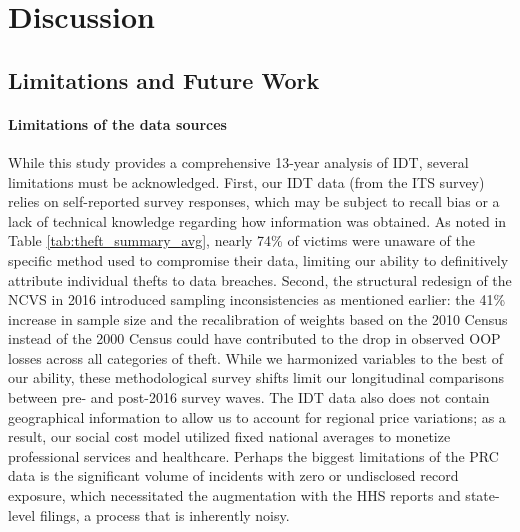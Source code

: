 \section{Discussion}
\label{sec:discussion}

\subsection{Limitations and Future Work}
\label{sec:limitations}

\paragraph{Limitations of the data sources}
While this study provides a comprehensive 13-year analysis of IDT, several limitations must be acknowledged. First, our IDT data (from the ITS survey) relies on self-reported survey responses, which may be subject to recall bias or a lack of technical knowledge regarding how information was obtained. As noted in Table \ref{tab:theft_summary_avg}, nearly 74\% of victims were unaware of the specific method used to compromise their data, limiting our ability to definitively attribute individual thefts to data breaches. Second, the structural redesign of the NCVS in 2016 introduced sampling inconsistencies as mentioned earlier: the 41\% increase in sample size and the recalibration of weights based on the 2010 Census instead of the 2000 Census could have contributed to the drop in observed OOP losses across all categories of theft. While we harmonized variables to the best of our ability, these methodological survey shifts limit our longitudinal comparisons between pre- and post-2016 survey waves. 
%
The IDT data also does not contain geographical information to allow us to account for regional price variations; as a result, our social cost model utilized fixed national averages to monetize professional services and healthcare.
%
Perhaps the biggest limitations of the PRC data is the significant volume of  incidents with zero or undisclosed record exposure, which necessitated the augmentation with the HHS reports and state-level filings, a process that is inherently noisy.


